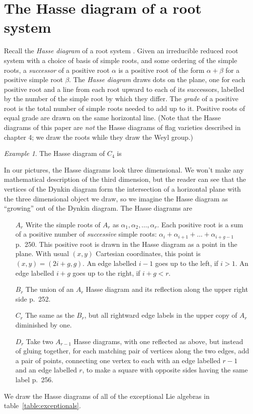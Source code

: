 \documentclass[a4paper,10pt]{amsart}
\theoremstyle{remark}
\newtheorem{example}{Example}
\begin{document}
\section{The Hasse diagram of a root system}
Recall the \emph{Hasse diagram} of a root system \cite{Ringel2013}.
Given an irreducible reduced root system with a choice of basis of simple roots, and some ordering of the simple roots, a \emph{successor} of a positive root \(\alpha\) is a positive root of the form \(\alpha+\beta\) for a positive simple root \(\beta\).
The \emph{Hasse diagram} draws dots on the plane, one for each positive root and a line from each root upward to each of its successors, labelled by the number of the simple root by which they differ.
The \emph{grade} of a positive root is the total number of simple roots needed to add up to it.
Positive roots of equal grade are drawn on the same horizontal line.
(Note that the Hasse diagrams of this paper are \emph{not} the Hasse diagrams of flag varieties described in \cite{Baston/Eastwood:1989} chapter 4; we draw the roots while they draw the Weyl group.)
\begin{example}
The Hasse diagram of \(C_4\) is
\tikzset{/Lie Hasse diagram,attach Dynkin diagram=true,three D=true}
\end{example}
In our pictures, the Hasse diagrams look three dimensional.
We won't make any mathematical description of the third dimension, but the reader can see that the vertices of the Dynkin diagram form the intersection of a horizontal plane with the three dimensional object we draw, so we imagine the Hasse diagram as ``growing'' out of the Dynkin diagram.
The Hasse diagrams are
\begin{enumerate}
\item[\(A_r\)] Write the simple roots of \(A_r\) as \(\alpha_1,\alpha_2,\dots,\alpha_r\).
Each positive root is a sum of a positive number of \emph{successive} simple roots: \(\alpha_i+\alpha_{i+1}+\dots+\alpha_{i+g-1}\) \cite{Bourbaki:2002} p.~250.
This positive root is drawn in the Hasse diagram as a point in the plane.
With usual \((x,y)\) Cartesian coordinates, this point is \((x,y)=(2i+g,g)\). 
An edge labelled \(i-1\) goes up to the left, if \(i>1\).
An edge labelled \(i+g\) goes up to the right, if \(i+g<r\).
\item[\(B_r\)] The union of an \(A_r\) Hasse diagram and its reflection along the upper right side  \cite{Bourbaki:2002} p.~252.
\item[\(C_r\)] The same as the \(B_r\), but all rightward edge labels in the upper copy of \(A_r\) diminished by one.
\item[\(D_r\)] 
Take two \(A_{r-1}\) Hasse diagrams, with one reflected as above, but instead of gluing together, for each matching pair of vertices along the two edges, add a pair of points, connecting one vertex to each with an edge labelled \(r-1\) and an edge labelled \(r\), to make a square with opposite sides having the same label \cite{Bourbaki:2002} p.~256.
\end{enumerate}
We draw the Hasse diagrams of all of the exceptional Lie algebras in table~\vref{table:exceptionals}.
\end{document}
